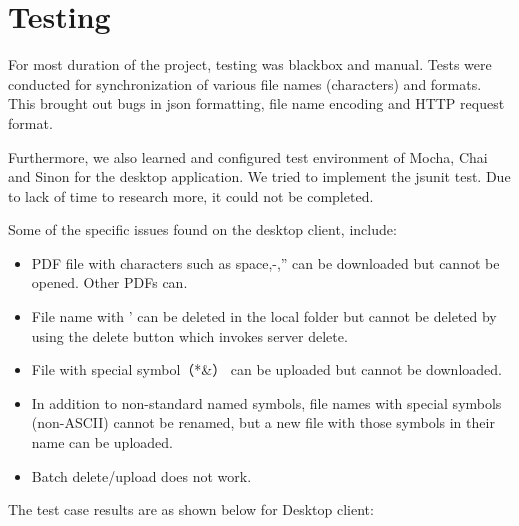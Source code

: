 
\section{Testing}

For most duration of the project, testing was blackbox and manual. Tests were conducted for synchronization of various file names (characters) and formats. This brought out bugs in json formatting, file name encoding and HTTP request format.\newline

Furthermore, we also learned and configured test environment of Mocha, Chai and Sinon for the desktop application. We tried to implement the jsunit test. Due to lack of time to research more, it could not be completed.\newline

Some of the specific issues found on the desktop client, include:\newline
\begin{itemize}
\item{PDF file with characters such as space,-,'' can be downloaded but cannot be opened. Other PDFs can.}\newline
\item{File name with ' can be deleted in the local folder but cannot be deleted by using the delete button which invokes server delete.}\newline
\item{File with special symbol（*\&） can be uploaded but cannot be downloaded.}\newline
\item{In addition to non-standard named symbols, file names with special symbols (non-ASCII) cannot be renamed, but a new file with those symbols in their name can be uploaded.}\newline
\item{Batch delete/upload does not work.}\newline
\end{itemize}

The test case results are as shown below for Desktop client:\newline

